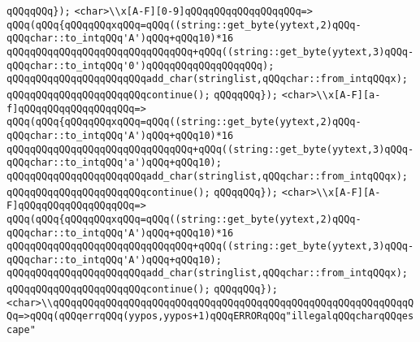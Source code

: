 \verb|qQQqqQQq});|\newline
\verb|<char>\\x[A-F][0-9]qQQqqQQqqQQqqQQqqQQq=>|\newline
\verb|qQQq(qQQq{qQQqqQQqxqQQq=qQQq((string::get_byte(yytext,2)qQQq-qQQqchar::to_intqQQq'A')qQQq+qQQq10)*16|\newline
\verb|qQQqqQQqqQQqqQQqqQQqqQQqqQQqqQQq+qQQq((string::get_byte(yytext,3)qQQq-qQQqchar::to_intqQQq'0')qQQqqQQqqQQqqQQqqQQq);|\newline
\verb|qQQqqQQqqQQqqQQqqQQqqQQqadd_char(stringlist,qQQqchar::from_intqQQqx);|\newline
\verb|qQQqqQQqqQQqqQQqqQQqqQQqcontinue();|\newline
\verb|qQQqqQQq});|\newline
\verb|<char>\\x[A-F][a-f]qQQqqQQqqQQqqQQqqQQq=>|\newline
\verb|qQQq(qQQq{qQQqqQQqxqQQq=qQQq((string::get_byte(yytext,2)qQQq-qQQqchar::to_intqQQq'A')qQQq+qQQq10)*16|\newline
\verb|qQQqqQQqqQQqqQQqqQQqqQQqqQQqqQQq+qQQq((string::get_byte(yytext,3)qQQq-qQQqchar::to_intqQQq'a')qQQq+qQQq10);|\newline
\verb|qQQqqQQqqQQqqQQqqQQqqQQqadd_char(stringlist,qQQqchar::from_intqQQqx);|\newline
\verb|qQQqqQQqqQQqqQQqqQQqqQQqcontinue();|\newline
\verb|qQQqqQQq});|\newline
\verb|<char>\\x[A-F][A-F]qQQqqQQqqQQqqQQqqQQq=>|\newline
\verb|qQQq(qQQq{qQQqqQQqxqQQq=qQQq((string::get_byte(yytext,2)qQQq-qQQqchar::to_intqQQq'A')qQQq+qQQq10)*16|\newline
\verb|qQQqqQQqqQQqqQQqqQQqqQQqqQQqqQQq+qQQq((string::get_byte(yytext,3)qQQq-qQQqchar::to_intqQQq'A')qQQq+qQQq10);|\newline
\verb|qQQqqQQqqQQqqQQqqQQqqQQqadd_char(stringlist,qQQqchar::from_intqQQqx);|\newline
\verb|qQQqqQQqqQQqqQQqqQQqqQQqcontinue();|\newline
\verb|qQQqqQQq});|\newline
\newline
\newline
\verb|<char>\\qQQqqQQqqQQqqQQqqQQqqQQqqQQqqQQqqQQqqQQqqQQqqQQqqQQqqQQqqQQqqQQq=>qQQq(qQQqerrqQQq(yypos,yypos+1)qQQqERRORqQQq"illegalqQQqcharqQQqescape"|\newline
